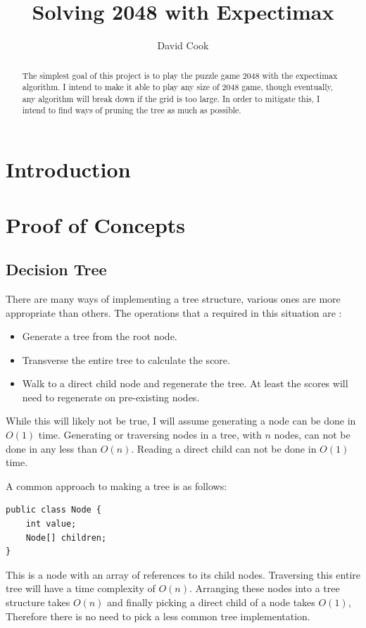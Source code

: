 \documentclass{article}
\title{Solving 2048 with Expectimax}
\author{David Cook}
\begin{document}
\maketitle

\tableofcontents

\begin{abstract}
The simplest goal of this project is to play the puzzle game 2048 with the expectimax algorithm. I intend to make it able to play any size of 2048 game, though eventually, any algorithm will break down if the grid is too large. In order to mitigate this, I intend to find ways of pruning the tree as much as possible.
\end{abstract}
\section{Introduction}
\label{sec:intro}
\section{Proof of Concepts}
\label{sec:proof_of_concepts}
\subsection{Decision Tree}
\label{subsec:dt}
There are many ways of implementing a tree structure, various ones are more appropriate than others. The operations that a required in this situation are \cite{russell2010artificial}:
\begin{itemize}
    \item Generate a tree from the root node.
    \item Transverse the entire tree to calculate the score.
    \item Walk to a direct child node and regenerate the tree. At least the scores will need to regenerate on pre-existing nodes.
\end{itemize}
While this will likely not be true, I will assume generating a node can be done in $O(1)$ time. Generating or traversing nodes in a tree, with $n$ nodes, can not be done in any less than $O(n)$. Reading a direct child can not be done in $O(1)$ time. \par
A common approach to making a tree is as follows:
\begin{verbatim}
public class Node {
    int value;
    Node[] children;
}
\end{verbatim}
This is a node with an array of references to its child nodes. Traversing this entire tree will have a time complexity of $O(n)$. Arranging these nodes into a tree structure takes $O(n)$ and finally picking a direct child of a node takes $O(1)$, Therefore there is no need to pick a less common tree implementation.
\end{document}
